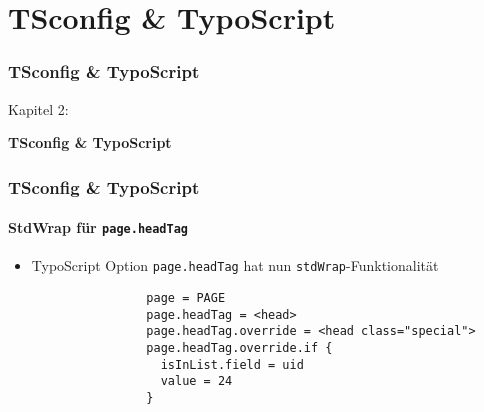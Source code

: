 %

\section{TSconfig \& TypoScript}
\begin{frame}[fragile]
	\frametitle{TSconfig \& TypoScript}

	\begin{center}\huge{Kapitel 2:}\end{center}
	\begin{center}\huge{\color{typo3darkgrey}\textbf{TSconfig \& TypoScript}}\end{center}

\end{frame}


\begin{frame}[fragile]
	\frametitle{TSconfig \& TypoScript}
	\framesubtitle{StdWrap für \texttt{page.headTag}}

	\begin{itemize}
		\item TypoScript Option \texttt{page.headTag} hat nun \texttt{stdWrap}-Funktionalität

			\begin{lstlisting}
				page = PAGE
				page.headTag = <head>
				page.headTag.override = <head class="special">
				page.headTag.override.if {
		  		  isInList.field = uid
		  		  value = 24
				}
			\end{lstlisting}

	\end{itemize}

\end{frame}

